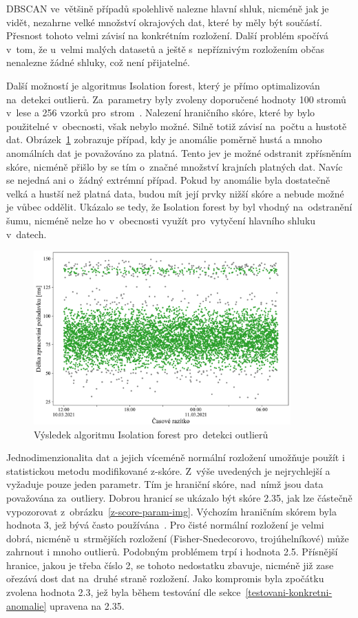 DBSCAN ve~většině případů spolehlivě nalezne hlavní shluk, nicméně jak je vidět, nezahrne velké množství okrajových dat, které by měly být součástí. Přesnost tohoto velmi závisí na konkrétním rozložení. Další problém spočívá v~tom, že u~velmi malých datasetů a ještě s~nepříznivým rozložením občas nenalezne žádné shluky, což není přijatelné.

Další možností je algoritmus Isolation forest, který je přímo optimalizován na~detekci outlierů. Za~parametry byly zvoleny doporučené hodnoty 100 stromů v~lese a 256 vzorků pro~strom~\cite{isolation-forest}. Nalezení hraničního skóre, které by bylo použitelné v~obecnosti, však nebylo možné. Silně totiž závisí na~počtu a hustotě dat. Obrázek~\ref{iForest-outlier-detection-img} zobrazuje případ, kdy je anomálie poměrně hustá a mnoho anomálních dat je považováno za platná. Tento jev je možné odstranit zpřísněním skóre, nicméně přišlo by se tím o~značné množství krajních platných dat. Navíc se nejedná ani o~žádný extrémní případ. Pokud by anomálie byla dostatečně velká a hustší než platná data, budou mít její prvky nižší skóre a nebude možné je vůbec oddělit. Ukázalo se tedy, že Isolation forest by byl vhodný na~odstranění šumu, nicméně nelze ho v~obecnosti využít pro~vytyčení hlavního shluku v~datech.

\begin{figure}[!hbt]
    \centering
    \includegraphics[width=0.88\textwidth]{obrazky/iForest-outlier-detection.pdf}
    \caption{Výsledek algoritmu Isolation forest pro~detekci outlierů}
    \label{iForest-outlier-detection-img}
\end{figure}

Jednodimenzionalita dat a jejich víceméně normální rozložení umožňuje použít i statistickou metodu modifikované z-skóre. Z~výše uvedených je nejrychlejší a vyžaduje pouze jeden parametr. Tím je hraniční skóre, nad~nímž jsou data považována za~outliery. Dobrou hranicí se ukázalo být skóre 2.35, jak lze částečně vypozorovat z~obrázku~\ref{z-score-param-img}. Výchozím hraničním skórem byla hodnota 3, jež bývá často používána~\cite{z-score}. Pro čisté normální rozložení je velmi dobrá, nicméně u~strmějších rozložení (Fisher-Snedecorovo, trojúhelníkové) může zahrnout i mnoho outlierů. Podobným problémem trpí i hodnota 2.5. Přísnější hranice, jakou je třeba číslo 2, se tohoto nedostatku zbavuje, nicméně již zase ořezává dost dat na~druhé straně rozložení. Jako kompromis byla zpočátku zvolena hodnota 2.3, jež byla během testování dle sekce~\ref{testovani-konkretni-anomalie} upravena na 2.35.

